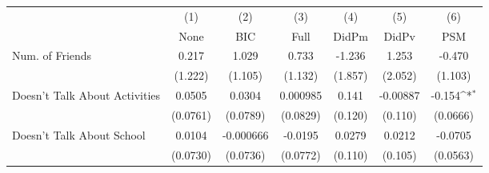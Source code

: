 {
\def\sym#1{\ifmmode^{#1}\else\(^{#1}\)\fi}
\begin{tabular}{l*{6}{c}}
\toprule
            &\multicolumn{1}{c}{(1)}&\multicolumn{1}{c}{(2)}&\multicolumn{1}{c}{(3)}&\multicolumn{1}{c}{(4)}&\multicolumn{1}{c}{(5)}&\multicolumn{1}{c}{(6)}\\
            &\multicolumn{1}{c}{None}&\multicolumn{1}{c}{BIC}&\multicolumn{1}{c}{Full}&\multicolumn{1}{c}{DidPm}&\multicolumn{1}{c}{DidPv}&\multicolumn{1}{c}{PSM}\\
\midrule
Num. of Friends&       0.217         &       1.029         &       0.733         &      -1.236         &       1.253         &      -0.470         \\
            &     (1.222)         &     (1.105)         &     (1.132)         &     (1.857)         &     (2.052)         &     (1.103)         \\
\addlinespace
Doesn't Talk About Activities&      0.0505         &      0.0304         &    0.000985         &       0.141         &    -0.00887         &      -0.154\sym{*}  \\
            &    (0.0761)         &    (0.0789)         &    (0.0829)         &     (0.120)         &     (0.110)         &    (0.0666)         \\
\addlinespace
Doesn't Talk About School&      0.0104         &   -0.000666         &     -0.0195         &      0.0279         &      0.0212         &     -0.0705         \\
            &    (0.0730)         &    (0.0736)         &    (0.0772)         &     (0.110)         &     (0.105)         &    (0.0563)         \\
\bottomrule
\end{tabular}
}
